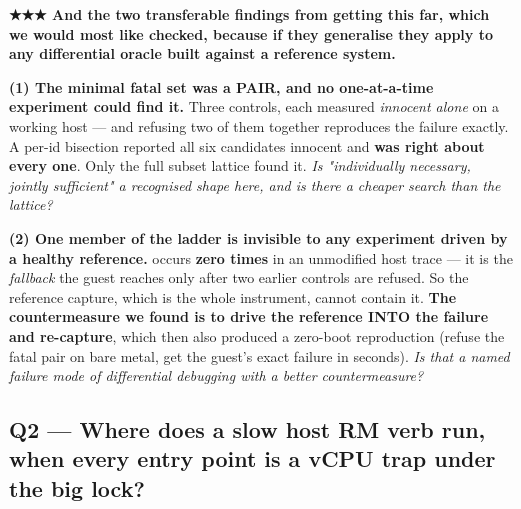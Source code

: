 \documentclass[10.5pt]{article}
\begin{document}
\begin{warnbox}\small
\textbf{★★★ And the two transferable findings from getting this far, which we would most like
checked, because if they generalise they apply to any differential oracle built against a
reference system.}

\smallskip
\textbf{(1) The minimal fatal set was a PAIR, and no one-at-a-time experiment could find it.}
Three controls, each measured \emph{innocent alone} on a working host — and refusing two of them
together reproduces the failure exactly. A per-id bisection reported all six candidates innocent
and \textbf{was right about every one}. Only the full subset lattice found it. \emph{Is
"individually necessary, jointly sufficient" a recognised shape here, and is there a cheaper
search than the lattice?}

\smallskip
\textbf{(2) One member of the ladder is invisible to any experiment driven by a healthy
reference.}  occurs \textbf{zero times} in an unmodified host trace — it is the
\emph{fallback} the guest reaches only after two earlier controls are refused. So the reference
capture, which is the whole instrument, cannot contain it. \textbf{The countermeasure we found is
to drive the reference INTO the failure and re-capture}, which then also produced a zero-boot
reproduction (refuse the fatal pair on bare metal, get the guest's exact failure in seconds).
\emph{Is that a named failure mode of differential debugging with a better countermeasure?}
\end{warnbox}

\subsection*{Q2 --- Where does a slow host RM verb run, when every entry point is a vCPU trap under the big lock?}
\end{document}
